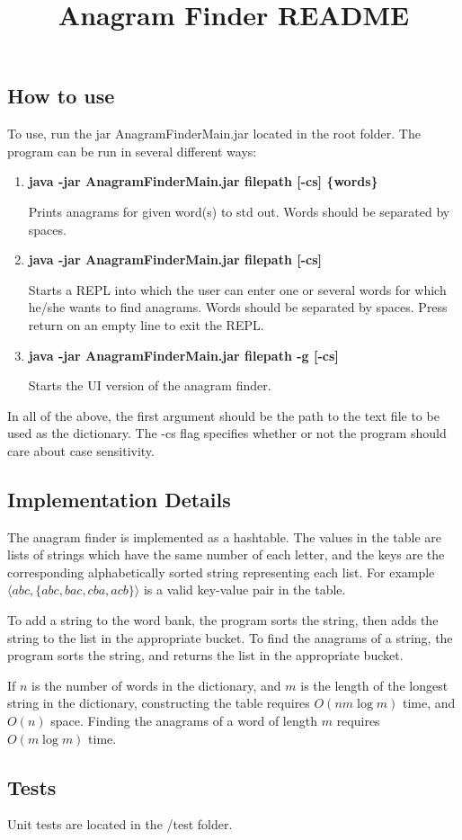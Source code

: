 \documentclass[12pt,letterpaper]{article}
\begin{document}
\title{\vspace{-2cm}Anagram Finder README\vspace{-1cm}}
\date{}
\maketitle
\subsection*{How to use}
To use, run the jar AnagramFinderMain.jar located in the root folder. The program can be run in several different ways:
\begin{enumerate}
\item {\bf java -jar AnagramFinderMain.jar filepath [-cs] \{words\}}

Prints anagrams for given word(s) to std out. Words should be separated by spaces.

\item {\bf java -jar AnagramFinderMain.jar filepath [-cs]}

Starts a REPL into which the user can enter one or several words for which he/she wants to find anagrams. Words should be separated by spaces. Press return on an empty line to exit the REPL.

\item {\bf java -jar AnagramFinderMain.jar filepath -g [-cs]}

Starts the UI version of the anagram finder.
\end{enumerate}

In all of the above, the first argument should be the path to the text file to be used as the dictionary. The -cs flag specifies whether or not the program should care about case sensitivity.
\subsection*{Implementation Details}
The anagram finder is implemented as a hashtable. The values in the table are lists of strings which have the same number of each letter, and the keys are the corresponding alphabetically sorted string representing each list. For example $\langle abc, \{abc, bac, cba, acb\} \rangle$ is a valid key-value pair in the table.

To add a string to the word bank, the program sorts the string, then adds the string to the list in the appropriate bucket. To find the anagrams of a string, the program sorts the string, and returns the list in the appropriate bucket.

If $n$ is the number of words in the dictionary, and $m$ is the length of the longest string in the dictionary, constructing the table requires $O(nm \log m)$ time, and $O(n)$ space. Finding the anagrams of a word of length $m$ requires $O(m \log m)$ time.

\subsection*{Tests}
Unit tests are located in the /test folder.
\end{document}
